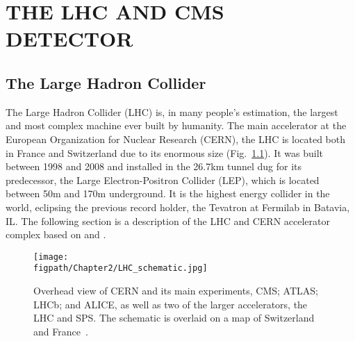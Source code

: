 %
%
%



\chapter{\uppercase {The LHC and CMS Detector}}
\label{ch:LHC_CMS}

\section{The Large Hadron Collider}
\label{sec:LHC}

The Large Hadron Collider (LHC) \cite{Breskin:1244506} is, in many people's estimation, the largest and most complex machine ever built by humanity.
The main accelerator at the European Organization for Nuclear Research (CERN), the LHC is located both in France and Switzerland due to its enormous size (Fig.~\ref{fig:LHC_schematic}).
It was built between 1998 and 2008 and installed in the 26.7\unit{km} tunnel dug for its predecessor, the Large Electron-Positron Collider (LEP), which is located between 50\unit{m} and 170\unit{m} underground.
It is the highest energy collider in the world, eclipsing the previous record holder, the Tevatron at Fermilab in Batavia, IL.
The following section is a description of the LHC and CERN accelerator complex based on \cite{LHCmachine} and \cite{Breskin:1244506}.

\begin{figure}[!hbt]
	\vspace*{-0.5cm}
	\centering
	\texttt{[image: \\figpath/Chapter2/LHC\_schematic.jpg]}
	\caption{Overhead view of CERN and its main experiments, CMS; ATLAS; LHCb; and ALICE, as well as two of the larger accelerators, the LHC and SPS. The schematic is overlaid on a map of Switzerland and France~\cite{LHC-schematic}.}
	\label{fig:LHC_schematic}
\end{figure}

